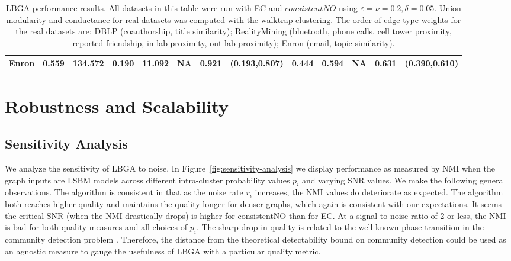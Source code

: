 \documentclass{article}
\begin{document}
\begin{table}
{\begin{tabular}{| l | c c  | c c c  r l | c c c  r l |}
Enron  & 0.559 & 134.572 &  0.190 & 11.092 &  NA    &  0.921 &  (0.193,0.807) &    0.444  & 0.594 & NA    &  0.631    & (0.390,0.610)\\
\hline
\end{tabular}
}
\caption{LBGA performance results. All datasets in this table were run with EC
and $consistentNO$ using $\varepsilon = \nu = 0.2, \delta = 0.05$. Union
modularity and conductance for real datasets was computed with the walktrap
clustering. The order of edge type weights for the real datasets are: DBLP
(coauthorship, title similarity); RealityMining (bluetooth, phone calls, cell
tower proximity, reported friendship, in-lab proximity, out-lab proximity);
Enron (email, topic similarity).} 
\label{EC_NO}
\end{table}


\section{Robustness and Scalability}
\label{sec:additional-analysis}

\subsection{Sensitivity Analysis} \label{sec:sensitivity-analysis} We analyze
the sensitivity of LBGA to noise. In Figure~\ref{fig:sensitivity-analysis} we
display performance as measured by NMI when the graph inputs are LSBM models
across different intra-cluster probability values $p_i$ and varying SNR values.
We make the following general observations.  The algorithm is consistent in
that as the noise rate $r_i$ increases, the NMI values do deteriorate as
expected. The algorithm both reaches higher quality and maintains the quality
longer for denser graphs, which again is consistent with our expectations. It
seems the critical SNR (when the NMI drastically drops) is higher for
consistentNO than for EC. At a signal to noise ratio of 2 or less, the NMI is
bad for both quality measures and all choices of $p_i$. The sharp drop in
quality is related to the well-known  phase transition in the community
detection problem \cite{nadakuditi2012}.  Therefore, the distance from the
theoretical detectability bound on community detection could be used as an
agnostic measure to gauge the usefulness of LBGA with a particular quality
metric.
\end{document}

